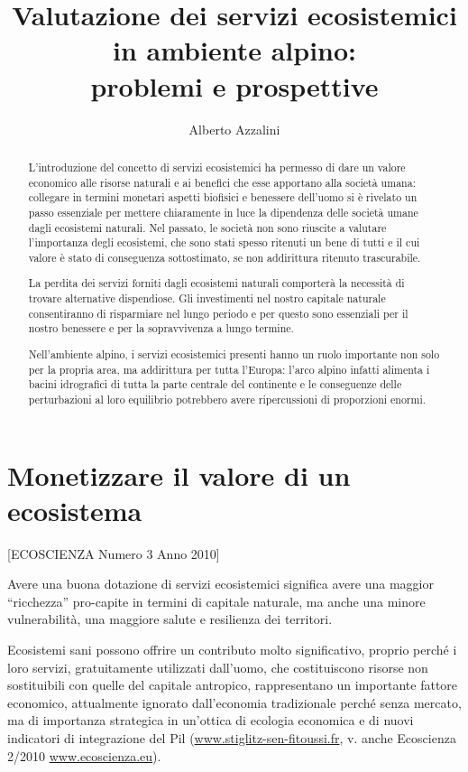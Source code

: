 \documentclass[11pt,a4paper]{article}
\author{Alberto Azzalini}
\title{Valutazione dei servizi ecosistemici in ambiente alpino:\\ problemi e prospettive}
\begin{document}
	\maketitle
	\begin{abstract}
		L'introduzione del concetto di servizi ecosistemici ha permesso di dare un valore economico alle risorse naturali e ai benefici che esse apportano alla società umana: collegare in termini monetari aspetti biofisici e benessere dell'uomo si è rivelato un passo essenziale per mettere chiaramente in luce la dipendenza delle società umane dagli ecosistemi naturali.
		Nel passato, le società non sono riuscite a valutare l'importanza degli ecosistemi, che sono stati spesso ritenuti un bene di tutti e il cui valore è stato di conseguenza sottostimato, se non addirittura ritenuto trascurabile.
		
		La perdita dei servizi forniti dagli ecosistemi naturali comporterà la necessità di trovare alternative dispendiose. Gli investimenti nel nostro capitale naturale consentiranno di risparmiare nel lungo periodo e per questo sono essenziali per il nostro benessere e per la sopravvivenza a lungo termine. \cite{Ecosystem_goods_and_services}
		
		Nell'ambiente alpino, i servizi ecosistemici presenti hanno un ruolo importante non solo per la propria area, ma addirittura per tutta l'Europa: l'arco alpino infatti alimenta i bacini idrografici di tutta la parte centrale del continente e le conseguenze delle perturbazioni al loro equilibrio potrebbero avere ripercussioni di proporzioni enormi.
		
		
	\end{abstract}
	\section{Monetizzare il valore di un ecosistema}

	[ECOSCIENZA Numero 3 Anno 2010]
	
	
	Avere una buona dotazione di servizi ecosistemici significa avere una maggior ``ricchezza'' pro-capite in termini di capitale naturale, ma anche una minore  vulnerabilità, una maggiore salute e resilienza dei territori.
	
	Ecosistemi sani possono offrire un contributo molto significativo, proprio perché i loro servizi, gratuitamente utilizzati dall'uomo, che costituiscono risorse non sostituibili con quelle del capitale antropico, rappresentano un importante fattore economico, attualmente ignorato dall'economia tradizionale perché senza mercato, ma di importanza strategica in un'ottica di ecologia economica e di nuovi indicatori di integrazione del Pil (\url{www.stiglitz-sen-fitoussi.fr}, v. anche Ecoscienza 2/2010 \url{www.ecoscienza.eu}).
	
\end{document}
